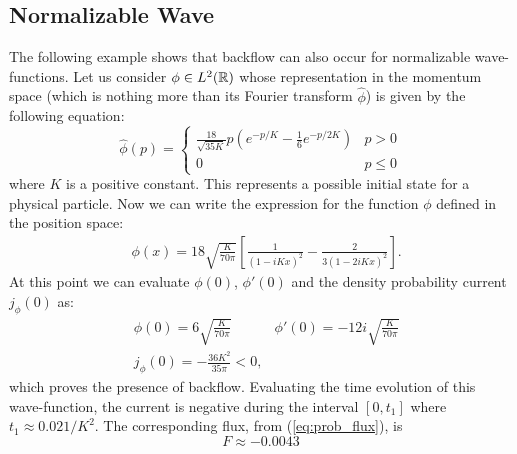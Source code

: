 \subsection{Normalizable Wave}

The following example shows that backflow can also occur for normalizable wave-functions. Let us consider $\phi\in L^2({\mathbb R})$ whose representation in the momentum space (which is nothing more than its Fourier transform $\hat{\phi}$) is given by the following equation:
\begin{equation}	
	\hat{\phi}(p)=\begin{cases}
	\frac{18}{\sqrt{35K}}p(e^{-p/K}-\frac{1}{6}e^{-p/2K}) & p>0\\
	0 & p\le 0
	\end{cases}
	\label{ex2:def}
\end{equation}
where $K$ is a positive constant. This represents a possible initial state for a physical particle. Now we can write the expression for the function $\phi$ defined in the position space:
\begin{equation}
\begin{aligned}
	&\phi(x)=18\sqrt{\frac{K}{70\pi}}\left[\frac{1}{(1-iKx)^2}-\frac{2}{3(1-2iKx)^2}\right].
\end{aligned}\label{ex2:position}
\end{equation}
At this point we can evaluate $\phi(0)$, $\phi'(0)$ and the density probability current $j_\phi(0)$ as:
\begin{equation}
\begin{aligned}
&\phi(0)=6\sqrt{\frac{K}{70\pi}} & \phi'(0)=-12i\sqrt{\frac{K}{70\pi}}\\
& j_\phi(0)=-\frac{36K^2}{35\pi }<0,
\end{aligned}
\end{equation}
which proves the presence of backflow. Evaluating the time evolution of this wave-function, the current is negative during the interval $[0,t_1]$ where $t_1 \approx 0.021/K^2$. The corresponding flux, from (\ref{eq:prob_flux}), is
\begin{equation}
	F\approx-0.0043
\end{equation}

